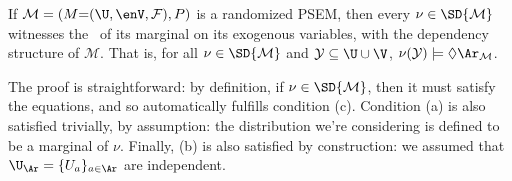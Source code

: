 \begin{subappendices}
\begin{prop}
    If $\mathcal M = (M
        {=} (\U,\enV,\mathcal F)
        , P)$ is a randomized PSEM, then
    every $\nu \in \SD{\mathcal M}$ 
    witnesses
    the \scibility\ of its marginal on its exogenous variables, with the dependency structure of $\mathcal M$.
    That is,
    for all $\nu \in \SD{\cal M}$ 
    and $\mathcal Y \subseteq \U \cup \V$, 
    $\nu(\mathcal Y) \models \Diamond \Ar_{\cal M}$. 
\end{prop}

The proof is straightforward: by definition, if $\nu \in \SD{\cal M}$, 
then it must satisfy the equations, and so automatically fulfills condition (c). 
Condition (a) is also satisfied trivially, by assumption: the distribution we're considering is defined to be a marginal of $\nu$.
Finally, (b) is also satisfied by construction: we assumed that $\U_{\Ar} = \{ U_a \}_{a \in \Ar}$ are independent.

% 
%
\commentout{
}
\end{subappendices}
